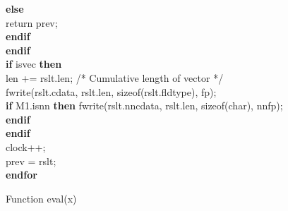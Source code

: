 \begin{figure}
{\begin{minipage}{20cm}
\begin{tabbing}
    {\bf else}  \+ \\ 
      return prev; \- \\
    {\bf endif} \- \\
  {\bf endif} \\
  {\bf if} isvec {\bf then} \+ \\
    len += rslt.len; /* Cumulative length of vector */ \\
    fwrite(rslt.cdata, rslt.len, sizeof(rslt.fldtype), fp); \\
{\bf if} M1.isnn {\bf then} fwrite(rslt.nncdata, rslt.len, sizeof(char), nnfp); {\bf endif} \- \\
  {\bf endif} \\ 
  clock++; \\
  prev = rslt; \- \\
{\bf endfor}
\end{tabbing}
\end{minipage}
}
\label{eval}
\caption{Function eval(x)}
\end{figure}

